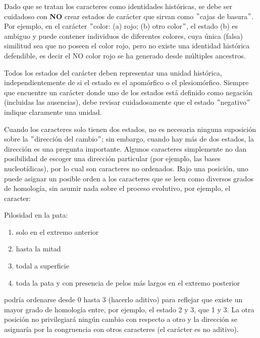 Dado que se tratan los caracteres como identidades hist\'oricas, se debe ser cuidadoso con \textbf{NO} crear estados de car\'acter que sirvan como $"$cajas de basura$"$. Por ejemplo, en el car\'acter $"$color: (a) rojo; (b) otro color$"$, el estado (b) es ambiguo y puede contener individuos de diferentes colores, cuya \'unica (falsa) similitud sea que no poseen el color rojo, pero no existe una identidad hist\'orica defendible, es decir el NO color rojo se ha generado desde m\'ultiples ancestros.


Todos los estados del car\'acter deben representar una unidad hist\'orica, independientemente de si el estado es el apom\'orfico o el 
plesiom\'orfico. 
Siempre que encuentre un car\'acter donde uno de los estados est\'a definido como negaci\'on (incluidas las ausencias), 
debe revisar cuidadosamente que el estado $"$negativo$"$ indique claramente una unidad.


Cuando los caracteres solo tienen dos estados, no es necesaria ninguna suposici\'on sobre la $"$direcci\'on del cambio$"$; 
sin embargo, cuando hay m\'as de dos estados, la direcci\'on es una pregunta importante. 
Algunos caracteres simplemente no dan posibilidad de escoger una direcci\'on particular (por ejemplo, las bases nucleot\'idicas), 
por lo cual son caracteres no ordenados. 
Bajo una posici\'on,  uno puede asignar un posible orden a los caracteres que se leen como diversos grados de homolog\'ia, 
sin asumir nada sobre el proceso evolutivo, 
por ejemplo, el caracter: 




\begin{small}
Pilosidad en la pata: 
\begin{enumerate}[start=0]
\item solo en el extremo anterior
\item hasta la mitad
\item todal a superficie
\item toda la pata y con presencia de pelos m\'as largos en el extremo posterior
\end{enumerate}	
\end{small}

podr\'ia ordenarse desde 0 hasta 3 (hacerlo aditivo) para reflejar que existe un mayor grado de homolog\'ia entre, por ejemplo, el estado 2 y 3, que 1 y 3. 
La otra posici\'on no privilegiar\'a ning\'un cambio con respecto a otro y la direcci\'on se asignar\'ia por la congruencia con otros caracteres (el car\'acter es no aditivo).


